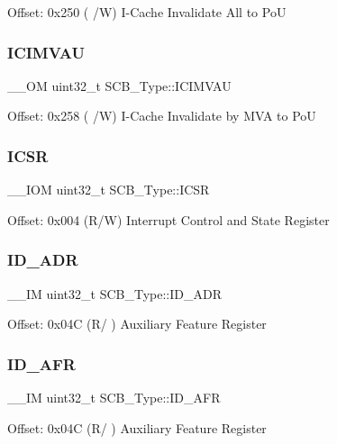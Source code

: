 Offset\+: 0x250 ( /W) I-\/\+Cache Invalidate All to PoU \mbox{\label{struct_s_c_b___type_a5eca5a3e5aedd89a9655df8f5798e2b0}} 
\subsubsection{\texorpdfstring{ICIMVAU}{ICIMVAU}}
{\footnotesize\ttfamily \+\_\+\+\_\+\+OM uint32\+\_\+t S\+C\+B\+\_\+\+Type\+::\+I\+C\+I\+M\+V\+AU}

Offset\+: 0x258 ( /W) I-\/\+Cache Invalidate by M\+VA to PoU \mbox{\label{struct_s_c_b___type_a0ca18ef984d132c6bf4d9b61cd00f05a}} 
\subsubsection{\texorpdfstring{ICSR}{ICSR}}
{\footnotesize\ttfamily \+\_\+\+\_\+\+I\+OM uint32\+\_\+t S\+C\+B\+\_\+\+Type\+::\+I\+C\+SR}

Offset\+: 0x004 (R/W) Interrupt Control and State Register \mbox{\label{struct_s_c_b___type_aa5c5a6ccc7042927ce3feadc41872aa4}} 
\subsubsection{\texorpdfstring{ID\_ADR}{ID\_ADR}}
{\footnotesize\ttfamily \+\_\+\+\_\+\+IM uint32\+\_\+t S\+C\+B\+\_\+\+Type\+::\+I\+D\+\_\+\+A\+DR}

Offset\+: 0x04C (R/ ) Auxiliary Feature Register \mbox{\label{struct_s_c_b___type_a9c9a1d805f8e99b9fd3ab4f455b6333a}} 
\subsubsection{\texorpdfstring{ID\_AFR}{ID\_AFR}}
{\footnotesize\ttfamily \+\_\+\+\_\+\+IM uint32\+\_\+t S\+C\+B\+\_\+\+Type\+::\+I\+D\+\_\+\+A\+FR}

Offset\+: 0x04C (R/ ) Auxiliary Feature Register \mbox{\label{struct_s_c_b___type_ada1d3119c020983fdc949c2ccd406caa}} 
